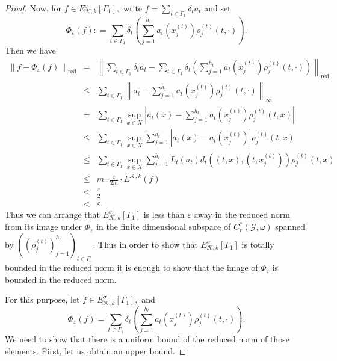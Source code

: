 \documentclass[a4paper,11pt,reqno]{amsart}
\theoremstyle{plain}
\theoremstyle{mainthmstyle}
\theoremstyle{named}
\numberwithin{equation}{section}
\newcommand{\Bea}{\begin{eqnarray*}}
\newcommand{\Eea}{\end{eqnarray*}}
\begin{document}
\begin{proof}
Now, for $f \in E_{\mathcal K, k}^{\sigma} [\Gamma_1],$ write $f = \sum\limits_{t \in \Gamma_1} \delta_t a_t$ and set $$\Phi_{\varepsilon} (f) : = \sum\limits_{t \in \Gamma_1} \delta_t \left (\sum\limits_{j = 1}^{h_t} a_t \left (x_j^{(t)} \right ) \rho_j^{(t)} (t, \cdot) \right ).$$
Then we have 
\Bea
\left \|f - \Phi_{\varepsilon} (f) \right \|_{\mathrm {red}} & = & \left \|\sum\limits_{t \in \Gamma_1} \delta_t a_t - \sum\limits_{t \in \Gamma_1} \delta_t \left (\sum\limits_{j = 1}^{h_t} a_t \left (x_j^{(t)} \right ) \rho_{j}^{(t)} (t, \cdot) \right ) \right \|_{\mathrm {red}} \\ & \leq & \sum\limits_{t \in \Gamma_1} \left \|a_t - \sum\limits_{j = 1}^{h_t} a_t \left (x_j^{(t)} \right ) \rho_{j}^{(t)} (t, \cdot) \right \|_{\infty} \\ & = & \sum\limits_{t \in \Gamma_1} \sup\limits_{x \in X} \left \lvert a_t (x) - \sum\limits_{j = 1}^{h_t} a_t \left (x_j^{(t)} \right ) \rho_{j}^{(t)} (t, x) \right \rvert \\ & \leq & \sum\limits_{t \in \Gamma_1} \sup\limits_{x \in X} \sum\limits_{j = 1}^{h_t} \left \lvert a_t (x) - a_t \left (x_j^{(t)} \right ) \right \rvert \rho_{j}^{(t)} (t, x) \\ & \leq & \sum\limits_{t \in \Gamma_1} \sup\limits_{x \in X} \sum\limits_{j = 1}^{h_t} L_t \left (a_t \right ) d_t \left ((t, x), (t, x_j^{(t)}) \right ) \rho_j^{(t)} (t, x) \\ & \leq & m \cdot \frac {\varepsilon} {2 m} \cdot L^{\mathcal K, k} (f) \\ & \leq & \frac {\varepsilon} {2} \\ & < & \varepsilon. 
\Eea
Thus we can arrange that $E_{\mathcal K, k}^{\sigma} [\Gamma_1]$ is less than $\varepsilon$ away in the reduced norm from its image under $\Phi_{\varepsilon}$ in the finite dimensional subspace of $C_r^{\ast} (\mathcal G, \omega)$ spanned by $\left ( \left (\rho_j^{(t)} \right )_{j = 1}^{h_t} \right )_{t \in \Gamma_1}.$ Thus in order to show that $E_{\mathcal K, k}^{\sigma} [\Gamma_1]$ is totally bounded in the reduced norm it is enough to show that the image of $\Phi_{\varepsilon}$ is bounded in the reduced norm.

\vspace{2mm}

For this purpose, let $f \in E_{\mathcal K, k}^{\sigma} [\Gamma_1],$ and $$\Phi_{\varepsilon} (f) = \sum\limits_{t \in \Gamma_1} \delta_t \left (\sum\limits_{j = 1}^{h_t} a_t \left (x_j^{(t)} \right ) \rho_{j}^{(t)} (t, \cdot ) \right ).$$ We need to show that there is a uniform bound of the reduced norm of those elements. First, let us obtain an upper bound.


\end{proof}
\end{document}
